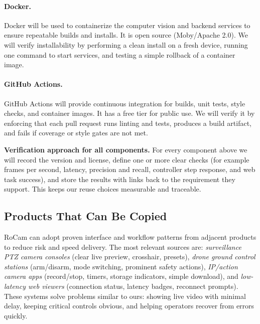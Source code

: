 \documentclass[12pt]{article}
\begin{document}
\paragraph{Docker.}
Docker will be used to containerize the computer vision and backend services to ensure repeatable builds and installs. It is open source (Moby/Apache 2.0). We will verify installability by performing a clean install on a fresh device, running one command to start services, and testing a simple rollback of a container image.

\paragraph{GitHub Actions.}
GitHub Actions will provide continuous integration for builds, unit tests, style checks, and container images. It has a free tier for public use. We will verify it by enforcing that each pull request runs linting and tests, produces a build artifact, and fails if coverage or style gates are not met.

\medskip
\noindent\textbf{Verification approach for all components.}
For every component above we will record the version and license, define one or more clear checks (for example frames per second, latency, precision and recall, controller step response, and web task success), and store the results with links back to the requirement they support. This keeps our reuse choices measurable and traceable.





\subsection{Products That Can Be Copied}
\label{sec:products-that-can-be-copied}

RoCam can adopt proven interface and workflow patterns from adjacent products to reduce risk and speed delivery. The most relevant sources are:
\textit{surveillance PTZ camera consoles} (clear live preview, crosshair, presets),
\textit{drone ground control stations} (arm/disarm, mode switching, prominent safety actions),
\textit{IP/action camera apps} (record/stop, timers, storage indicators, simple download),
and \textit{low-latency web viewers} (connection status, latency badges, reconnect prompts).
These systems solve problems similar to ours: showing live video with minimal delay, keeping critical controls obvious, and helping operators recover from errors quickly.
\end{document}
